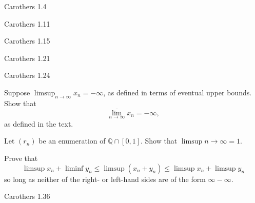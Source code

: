\documentclass[minion]{homework641}
\begin{document}
\begin{aproblems}

\hproblem Carothers 1.4

\hproblem Carothers 1.11

\hproblem Carothers 1.15

\hproblem Carothers 1.21

\hproblem Carothers 1.24

\hproblem Suppose $\limsup_{n\rightarrow\infty} x_n = -\infty$, as defined in terms
of eventual upper bounds.  Show that $$
\overline{\lim_{n\rightarrow\infty}} x_n =-\infty,
$$ as defined in the text.

\hproblem Let $(r_n)$ be an enumeration of $\mathbb Q\cap [0,1]$.  Show that
$\limsup{n\rightarrow\infty} = 1$.


\hproblem Prove that
$$
\limsup x_n + \liminf y_n \le \limsup (x_n+y_n) \le \limsup x_n + \limsup y_n
$$
so long as neither of the right- or left-hand sides are of the form $\infty-\infty$.

\hproblem Carothers 1.36

\end{aproblems}
\end{document}
